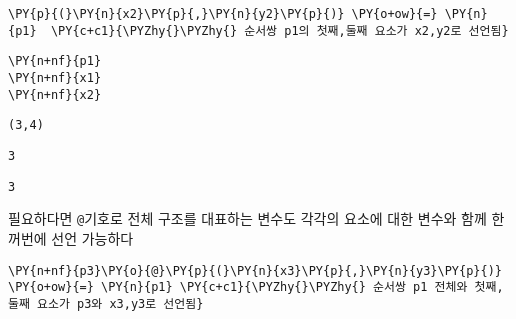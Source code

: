     \begin{tcolorbox}[breakable, size=fbox, boxrule=1pt, pad at break*=1mm,colback=cellbackground, colframe=cellborder, top=.75ex]
\begin{Verbatim}[commandchars=\\\{\}]
\PY{p}{(}\PY{n}{x2}\PY{p}{,}\PY{n}{y2}\PY{p}{)} \PY{o+ow}{=} \PY{n}{p1}  \PY{c+c1}{\PYZhy{}\PYZhy{} 순서쌍 p1의 첫째,둘째 요소가 x2,y2로 선언됨}
\end{Verbatim}
\end{tcolorbox}

    \begin{tcolorbox}[breakable, size=fbox, boxrule=1pt, pad at break*=1mm,colback=cellbackground, colframe=cellborder, top=.75ex]
\begin{Verbatim}[commandchars=\\\{\}]
\PY{n+nf}{p1}
\PY{n+nf}{x1}
\PY{n+nf}{x2}
\end{Verbatim}
\end{tcolorbox}

    
    \begin{Verbatim}[commandchars=\\\{\}]
(3,4)
    \end{Verbatim}

    
    
    \begin{Verbatim}[commandchars=\\\{\}]
3
    \end{Verbatim}

    
    
    \begin{Verbatim}[commandchars=\\\{\}]
3
    \end{Verbatim}

    
    \noindent 필요하다면 \texttt{@}기호로 전체 구조를 대표하는 변수도 각각의
요소에 대한 변수와 함께 한꺼번에 선언 가능하다

    \begin{tcolorbox}[breakable, size=fbox, boxrule=1pt, pad at break*=1mm,colback=cellbackground, colframe=cellborder, top=.75ex]
\begin{Verbatim}[commandchars=\\\{\}]
\PY{n+nf}{p3}\PY{o}{@}\PY{p}{(}\PY{n}{x3}\PY{p}{,}\PY{n}{y3}\PY{p}{)} \PY{o+ow}{=} \PY{n}{p1} \PY{c+c1}{\PYZhy{}\PYZhy{} 순서쌍 p1 전체와 첫째,둘째 요소가 p3와 x3,y3로 선언됨}
\end{Verbatim}
\end{tcolorbox}

